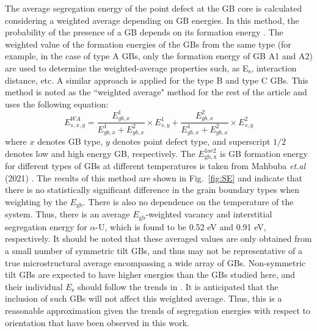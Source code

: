 \documentclass[review]{elsarticle}
\begin{document}
The average segregation energy of the point defect at the GB core is calculated considering a weighted average depending on GB energies. In this method, the probability of the presence of a GB depends on its formation energy \cite{WILLIAMS201545}. The weighted value of the formation energies of the GBs from the same type (for example, in the case of type A GBs, only the formation energy of GB A1 and A2) are used to determine the weighted-average properties such, as E$_\mathrm{s}$, interaction distance, etc. A similar approach is applied for the type B and type C GBs. This method is noted as the ``weighted average" method for the rest of the article and uses the following equation:
\begin{equation}
\label{eq:weight}
E_{s,x,y}^{WA} = \frac{E_{gb,x}^{1}}{E_{gb,x}^{1}+E_{gb,x}^{2}} \times E_{s,y}^{1} + \frac{E_{gb,x}^{2}}{E_{gb,x}^{1}+E_{gb,x}^{2}} \times E_{s,y}^{2}
\end{equation} 
\noindent where $x$ denotes GB type, $y$ denotes point defect type, and superscript $1/2$ denotes low and high energy GB, respectively. The $E_{\mathrm{gb, x}}^{1 or 2}$ is GB formation energy for different types of GBs at different temperatures is taken from Mahbuba \textit{et.al} (2021) \cite{MAHBUBA2021153072}. The results of this method are shown in Fig.~\ref{fig:SE} and indicate that there is no statistically significant difference in the grain boundary types when weighting by the $E_{\mathrm{gb}}$. There is also no dependence on the temperature of the system. Thus, there is an average $E_{\mathrm{gb}}$-weighted vacancy and interstitial segregation energy for $\alpha$-U, which is found to be 0.52 eV and 0.91 eV, respectively. It should be noted that these averaged values are only obtained from a small number of symmetric tilt GBs, and thus may not be representative of a true microstructural average encompassing a wide array of GBs. Non-symmetric tilt GBs are expected to have higher energies than the GBs studied here, and their individual $E_{\mathrm{s}}$ should follow the trends in . It is anticipated that the inclusion of such GBs will not affect this weighted average. Thus, this is a reasonable approximation given the trends of segregation energies with respect to orientation that have been observed in this work. 
\end{document}
